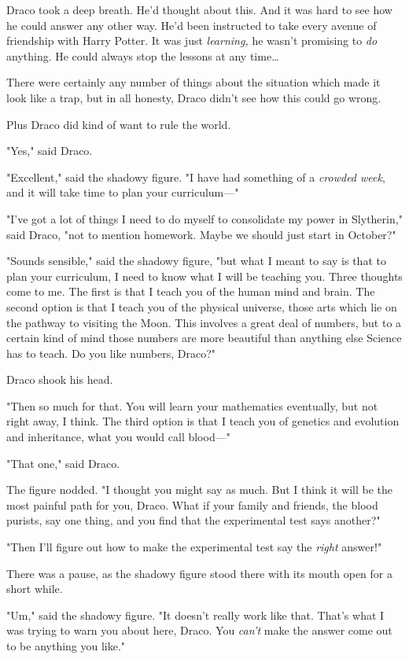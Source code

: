 Draco took a deep breath. He'd thought about this. And it was hard to see how
he could answer any other way. He'd been instructed to take every avenue of
friendship with Harry Potter. It was just \emph{learning,} he wasn't promising
to \emph{do} anything. He could always stop the lessons at any time{\ldots}

There were certainly any number of things about the situation which made it
look like a trap, but in all honesty, Draco didn't see how this could go wrong.

Plus Draco did kind of want to rule the world.

"Yes," said Draco.

"Excellent," said the shadowy figure. "I have had something of a \emph{crowded
week}, and it will take time to plan your curriculum---"

"I've got a lot of things I need to do myself to consolidate my power in
Slytherin," said Draco, "not to mention homework. Maybe we should just start in
October?"

"Sounds sensible," said the shadowy figure, "but what I meant to say is that to
plan your curriculum, I need to know what I will be teaching you. Three
thoughts come to me. The first is that I teach you of the human mind and brain.
The second option is that I teach you of the physical universe, those arts
which lie on the pathway to visiting the Moon. This involves a great deal of
numbers, but to a certain kind of mind those numbers are more beautiful than
anything else Science has to teach. Do you like numbers, Draco?"

Draco shook his head.

"Then so much for that. You will learn your mathematics eventually, but not
right away, I think. The third option is that I teach you of genetics and
evolution and inheritance, what you would call blood---"

"That one," said Draco.

The figure nodded. "I thought you might say as much. But I think it will be the
most painful path for you, Draco. What if your family and friends, the blood
purists, say one thing, and you find that the experimental test says another?"

"Then I'll figure out how to make the experimental test say the \emph{right}
answer!"

There was a pause, as the shadowy figure stood there with its mouth open for a
short while.

"Um," said the shadowy figure. "It doesn't really work like that. That's what I
was trying to warn you about here, Draco. You \emph{can't} make the answer come
out to be anything you like."

